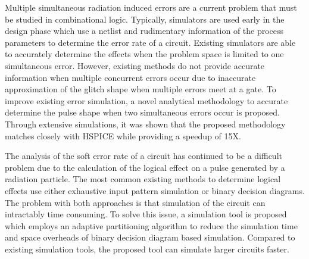 Multiple simultaneous radiation induced errors are a current problem that must be studied in combinational logic. Typically, simulators are used early in the design phase which use a netlist and rudimentary information of the process parameters to determine the error rate of a circuit. Existing simulators are able to accurately determine the effects when the problem space is limited to one simultaneous error. However, existing methods do not provide accurate information when multiple concurrent errors occur due to inaccurate approximation of the glitch shape when multiple errors meet at a gate. To improve existing error simulation, a novel analytical methodology to accurate determine the pulse shape when two simultaneous errors occur is proposed. Through extensive simulations, it was shown that the proposed methodology matches closely with HSPICE while providing a speedup of 15X.

The analysis of the soft error rate of a circuit has continued to be a difficult problem due to the calculation of the logical effect on a pulse generated by a radiation particle. The most common existing methods to determine logical effects use either exhaustive input pattern simulation or binary decision diagrams. The problem with both approaches is that simulation of the circuit can intractably time consuming. To solve this issue, a simulation tool is proposed which employs an adaptive partitioning algorithm to reduce the simulation time and space overheads of binary decision diagram based simulation. Compared to existing simulation tools, the proposed tool can simulate larger circuits faster.
\newpage

